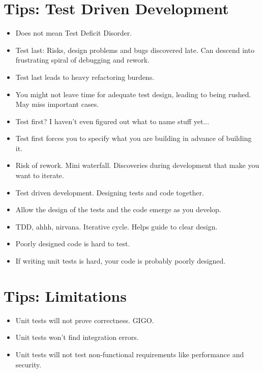 \documentclass{article}
\begin{document}
\newpage
\section{Tips: Test Driven Development}
\begin{itemize}
    \item Does not mean Test Deficit Disorder.
    \item Test last: Risks, design problems and bugs discovered late. Can
        descend into frustrating spiral of debugging and rework.
    \item Test last leads to heavy refactoring burdens.
    \item You might not leave time for adequate test design, leading to being
        rushed. May miss important cases.
    \item Test first? I haven't even figured out what to name stuff yet...
    \item Test first forces you to specify what you are building in advance
        of building it.
    \item Risk of rework. Mini waterfall. Discoveries during development that
        make you want to iterate.
    \item Test driven development. Designing tests and code together.
    \item Allow the design of the tests and the code emerge as you develop.
    \item TDD, ahhh, nirvana. Iterative cycle. Helps guide to clear design.
    \item Poorly designed code is hard to test.
    \item If writing unit tests is hard, your code is probably poorly designed.
\end{itemize}

\newpage
\section{Tips: Limitations}
\begin{itemize}
    \item Unit tests will not prove correctness. GIGO.
    \item Unit tests won't find integration errors.
    \item Unit tests will not test non-functional requirements like performance
        and security.
\end{itemize}

\newpage
\end{document}

